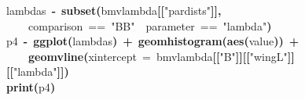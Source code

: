 \documentclass{elsarticle}
\makeatletter
\newcommand{\hlfunctioncall}[1]{\textcolor[rgb]{.5,0,.33}{\textbf{#1}}}%
\newcommand{\hlstring}[1]{\textcolor[rgb]{.6,.6,1}{#1}}%
\newcommand{\hlkeyword}[1]{\textbf{#1}}%
\newcommand{\hlargument}[1]{\textcolor[rgb]{.69,.25,.02}{#1}}%
\newcommand{\hlassignement}[1]{\textbf{#1}}%
\newcommand{\hlsymbol}[1]{#1}%
\newcommand{\hlstd}[1]{\textcolor[rgb]{0,0,0}{#1}}%
\newenvironment{kframe}{%
 \def\FrameCommand##1{\hskip\@totalleftmargin \hskip-\fboxsep
 \colorbox{shadecolor}{##1}\hskip-\fboxsep
     \hskip-\linewidth \hskip-\@totalleftmargin \hskip\columnwidth}%
 \MakeFramed {\advance\hsize-\width
   \@totalleftmargin\z@ \linewidth\hsize
   \@setminipage}}%
 {\par\unskip\endMakeFramed}
\newenvironment{knitrout}{}{} %
\makeatother
\begin{document}
\begin{figure}
\begin{center}
\begin{knitrout}
\color{fgcolor}\begin{kframe}
\begin{flushleft}
\ttfamily\noindent
\hlsymbol{lambdas}{\ }\hlassignement{\usebox{\hlnormalsizeboxlessthan}-}{\ }\hlfunctioncall{subset}\hlkeyword{(}\hlsymbol{bm\usebox{\hlnormalsizeboxunderscore}v\usebox{\hlnormalsizeboxunderscore}lambda}\hlkeyword{[[}\hlstring{"{}par\usebox{\hlnormalsizeboxunderscore}dists"{}}\hlkeyword{]}\hlkeyword{]}\hlkeyword{,}\hspace*{\fill}\\
\hlstd{}{\ }{\ }{\ }{\ }\hlsymbol{comparison}{\ }=={\ }\hlstring{"{}BB"{}}{\ }\hlkeyword{\usebox{\hlnormalsizeboxand}}{\ }\hlsymbol{parameter}{\ }=={\ }\hlstring{"{}lambda"{}}\hlkeyword{)}\hspace*{\fill}\\
\hlstd{}\hlsymbol{p4}{\ }\hlassignement{\usebox{\hlnormalsizeboxlessthan}-}{\ }\hlfunctioncall{ggplot}\hlkeyword{(}\hlsymbol{lambdas}\hlkeyword{)}{\ }\hlkeyword{+}{\ }\hlfunctioncall{geom\usebox{\hlnormalsizeboxunderscore}histogram}\hlkeyword{(}\hlfunctioncall{aes}\hlkeyword{(}\hlsymbol{value}\hlkeyword{)}\hlkeyword{)}{\ }\hlkeyword{+}\hspace*{\fill}\\
\hlstd{}{\ }{\ }{\ }{\ }\hlfunctioncall{geom\usebox{\hlnormalsizeboxunderscore}vline}\hlkeyword{(}\hlargument{xintercept}{\ }\hlargument{=}{\ }\hlsymbol{bm\usebox{\hlnormalsizeboxunderscore}v\usebox{\hlnormalsizeboxunderscore}lambda}\hlkeyword{[[}\hlstring{"{}B"{}}\hlkeyword{]}\hlkeyword{]}\hlkeyword{[[}\hlstring{"{}wingL"{}}\hlkeyword{]}\hlkeyword{]}\hlkeyword{[[}\hlstring{"{}lambda"{}}\hlkeyword{]}\hlkeyword{]}\hlkeyword{)}\hspace*{\fill}\\
\hlstd{}\hlfunctioncall{print}\hlkeyword{(}\hlsymbol{p4}\hlkeyword{)}\mbox{}
\normalfont
\end{flushleft}



\end{kframe}
\end{knitrout}
\end{center}
\end{figure}
\end{document}
